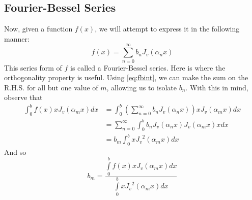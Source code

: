 \documentclass[]{article}
\begin{document}
\subsection{Fourier-Bessel Series}
Now, given a function $f(x)$, we will attempt to express it in the following manner:
\[
	f(x) = \sum_{n=0}^{\infty}b_nJ_v(\alpha_nx)
\]
This series form of $f$ is called a Fourier-Bessel series. Here is where the orthogonality property is useful. Using \eqref{eq:fbint}, we can make the sum on the R.H.S. for all but one value of $m$, allowing us to isolate $b_n$. With this in mind, observe that
\begin{align*}
	\int_{0}^{b}f(x)xJ_v(\alpha_mx)dx & = \int_{0}^{b} \left(\sum_{n=0}^{\infty}b_nJ_v(\alpha_nx) \right)x J_v(\alpha_mx)dx\\
	&= \sum_{n=0}^{\infty}\int_{0}^{b}b_nJ_v(\alpha_nx)J_v(\alpha_mx)xdx \\
	&= b_m\int_{0}^{b} x{J_v}^2(\alpha_mx)dx
\end{align*}
And so
\begin{equation}
	b_m = \frac{\int\limits_{0}^{b}f(x)xJ_v(\alpha_mx)dx }{ \int\limits_0^b x{J_v}^2(\alpha_mx)dx}	
\end{equation}
\end{document}
